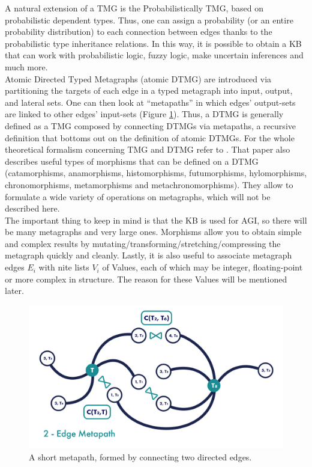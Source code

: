 A natural extension of a TMG is the Probabilistically TMG, based on probabilistic dependent types. Thus, one can assign a probability (or an entire probability distribution) to each connection between edges thanks to the probabilistic type inheritance relations. In this way, it is possible to obtain a KB that can work with probabilistic logic, fuzzy logic, make uncertain inferences and much more. \\
Atomic Directed Typed Metagraphs (atomic DTMG) are introduced via partitioning the targets of each edge in a typed metagraph into input, output, and lateral sets. One can then look at \enquote{metapaths} in which edges' output-sets are linked to other edges' input-sets (Figure \ref{fig:typed_metapath}). Thus, a DTMG is generally defined as a TMG composed by connecting DTMGs via metapaths, a recursive definition that bottoms out on the definition of atomic DTMGs.
For the whole theoretical formalism concerning TMG and DTMG refer to \cite{DBLP:journals/corr/abs-2012-01759}. 
That paper also describes useful types of morphisms that can be defined on a DTMG (catamorphisms, anamorphisms, histomorphisms, futumorphisms, hylomorphisms, chrono\-morphisms, metamorphisms and metachronomorphisms). 
They allow to formulate a wide variety of operations on metagraphs, which will not be described here. \\
The important thing to keep in mind is that the KB is used for AGI, so there will be many metagraphs and very large ones. Morphisms allow you to obtain simple and complex results by mutating/transforming/stretching/compressing the metagraph quickly and cleanly. 
Lastly, it is also useful to associate metagraph edges $E_{i}$ with nite lists $V_{i}$ of Values, each of which may be integer, floating-point or more complex in structure. The reason for these Values will be mentioned later.

\begin{figure}[h]
\centering
\includegraphics[width=0.65
\textwidth]{figures/Magistrale/typed_metapath}
\caption[Metapath]{A short metapath, formed by connecting two directed edges.
\label{fig:typed_metapath}}
\end{figure}

